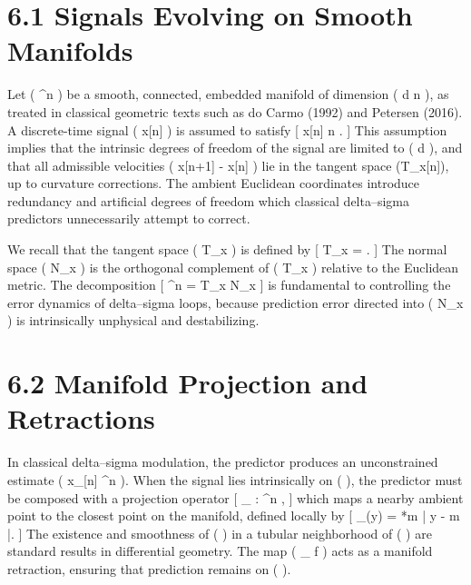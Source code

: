 \section{6.1 Signals Evolving on Smooth Manifolds}

Let (  \subset {}^{n} ) be a smooth, connected, embedded manifold of dimension ( d \ll n ), as treated in classical geometric texts such as do Carmo (1992) and Petersen (2016). A discrete-time signal ( x[n] ) is assumed to satisfy
[
x[n] \in {} \qquad {} n \in {}.
]
This assumption implies that the intrinsic degrees of freedom of the signal are limited to ( d ), and that all admissible velocities ( x[n+1] - x[n] ) lie in the tangent space (T_{x[n]}), up to curvature corrections. The ambient Euclidean coordinates introduce redundancy and artificial degrees of freedom which classical delta--sigma predictors unnecessarily attempt to correct.

We recall that the tangent space ( T_{x} ) is defined by
[
T_{x} = .
]
The normal space ( N_{x} ) is the orthogonal complement of ( T_{x} ) relative to the Euclidean metric. The decomposition
[
^{n} = T_{x} \oplus N_{x}
]
is fundamental to controlling the error dynamics of delta--sigma loops, because prediction error directed into ( N_{x} ) is intrinsically unphysical and destabilizing.

\section{6.2 Manifold Projection and Retractions}

In classical delta--sigma modulation, the predictor produces an unconstrained estimate ( x_{}[n] \in {}^{n} ). When the signal lies intrinsically on (  ), the predictor must be composed with a projection operator
[
\Pi_{} : ^{n} \to {},
]
which maps a nearby ambient point to the closest point on the manifold, defined locally by
[
\Pi_{}(y) = *{m \in {}} | y - m |.
]
The existence and smoothness of (  ) in a tubular neighborhood of (  ) are standard results in differential geometry. The map ( \Pi_{} \circ f ) acts as a manifold retraction, ensuring that prediction remains on (  ).

